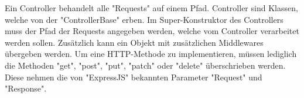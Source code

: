 
Ein Controller behandelt alle "Requests" auf einem Pfad. 
Controller sind Klassen, welche von der "ControllerBase" erben. Im Super-Konstruktor des Controllers muss der Pfad der Requests angegeben werden, welche vom Controller verarbeitet werden sollen. Zusätzlich kann ein Objekt mit zusätzlichen Middlewares übergeben werden. Um eine HTTP-Methode zu implementieren, müssen lediglich die Methoden "get", "post", "put", "patch" oder "delete" überschrieben werden. Diese nehmen die von "ExpressJS" bekannten Parameter "Request" und "Response". 
